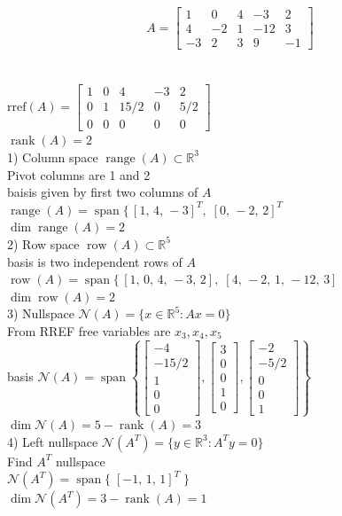 \documentclass{article}
\begin{document}
{{\begin{enumerate}
$$A=\left[
\begin{array}{ccccc}
1 & 0 & 4 & -3 & 2\\
4 & -2  & 1 & -12 & 3\\
-3 & 2 & 3 & 9 & -1
\end{array}
\right]$$
\\
\\$\mathrm{rref}(A)=\begin{bmatrix}
1 & 0 & 4 & -3 & 2\\[4pt]
0 & 1 & 15/2 & 0 & 5/2\\[4pt]
0 & 0 & 0 & 0 & 0
\end{bmatrix}$
\\$\operatorname{rank}(A)=2$
\\1) Column space $\operatorname{range}(A)\subset\mathbb R^3$
\\Pivot columns are 1 and 2
\\baisis given by first two columns of $A$
\\$\operatorname{range}(A)=\operatorname{span}\{\,[1,\,4,\,-3]^T,\;[0,\,-2,\,2]^T$
\\$\dim\operatorname{range}(A)=2$
\\2) Row space $\operatorname{row}(A)\subset\mathbb R^5$
\\basis is two independent rows of $A$
\\$\operatorname{row}(A)=\operatorname{span}\{\,[1,\,0,\,4,\,-3,\,2],\;[4,\,-2,\,1,\,-12,\,3]$
\\$\dim\operatorname{row}(A)=2$
\\3) Nullspace $\mathcal N(A)=\{x\in\mathbb R^5:Ax=0\}$
\\From RREF free variables are $x_3,x_4,x_5$
\\basis $\mathcal N(A)=\operatorname{span}\left\{\begin{bmatrix}-4\\-15/2\\1\\0\\0\end{bmatrix}, \begin{bmatrix}3\\0\\0\\1\\0\end{bmatrix}, \begin{bmatrix}-2\\-5/2\\0\\0\\1\end{bmatrix}\right\}$
\\$\dim\mathcal N(A)=5- \operatorname{rank}(A)=3$
\\4) Left nullspace $\mathcal N(A^T)=\{y\in\mathbb R^3: A^Ty=0\}$
\\Find $A^T$ nullspace
\\$\mathcal N(A^T)=\operatorname{span}\{\;[-1,\,1,\,1]^T\;\}$
\\$\dim\mathcal N(A^T)=3-\operatorname{rank}(A)=1$


\end{enumerate}}}
\end{document}
